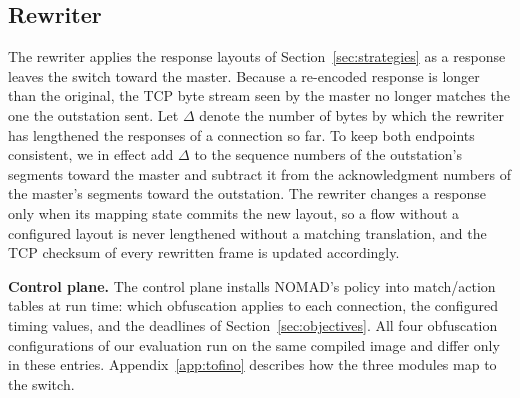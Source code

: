 \subsection{Rewriter}

The rewriter applies the response layouts of Section~\ref{sec:strategies} as a response leaves the switch toward the master. Because a re-encoded response is longer than the original, the TCP byte stream seen by the master no longer matches the one the outstation sent. Let $\Delta$ denote the number of bytes by which the rewriter has lengthened the responses of a connection so far. To keep both endpoints consistent, we in effect add $\Delta$ to the sequence numbers of the outstation's segments toward the master and subtract it from the acknowledgment numbers of the master's segments toward the outstation. The rewriter changes a response only when its mapping state commits the new layout, so a flow without a configured layout is never lengthened without a matching translation, and the TCP checksum of every rewritten frame is updated accordingly.

\textbf{Control plane.} The control plane installs NOMAD's policy into match/action tables at run time: which obfuscation applies to each connection, the configured timing values, and the deadlines of Section~\ref{sec:objectives}. All four obfuscation configurations of our evaluation run on the same compiled image and differ only in these entries. Appendix~\ref{app:tofino} describes how the three modules map to the switch.
